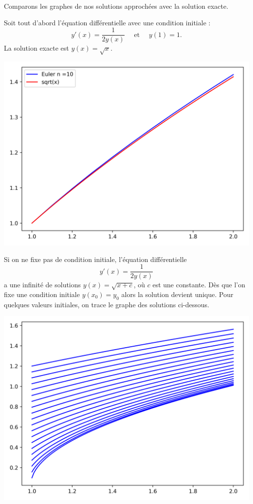 \documentclass[11pt,class=report,crop=false]{standalone}
\begin{document}
Comparons les graphes de nos solutions approchées avec la solution exacte.

\begin{exemple}
Soit tout d'abord l'équation différentielle avec une condition initiale :
$$y'(x) = \frac{1}{2y(x)} \quad \text{ et } \quad y(1) = 1.$$
La solution exacte est $y(x) = \sqrt{x}$.
\begin{center}
  \includegraphics[scale=\myscale,scale=0.6]{figures/equadiff-euler-01}
\end{center}

Si on ne fixe pas de condition initiale, l'équation différentielle 
$$y'(x) = \frac{1}{2y(x)}$$
a une infinité de solutions $y(x) = \sqrt{x+c}$, où $c$ est une constante.
Dès que l'on fixe une condition initiale $y(x_0) = y_0$ alors la solution devient unique.
Pour quelques valeurs initiales, on trace le graphe des solutions ci-dessous.
\begin{center}
    \includegraphics[scale=\myscale,scale=0.6]{figures/equadiff-euler-02}
  \end{center}
\end{exemple}
\end{document}
